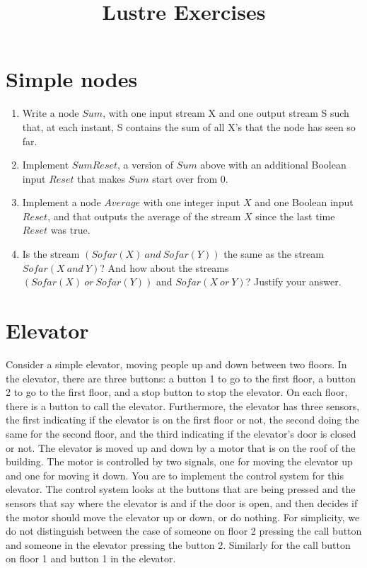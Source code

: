 \documentclass[11pt]{article}
\title{Lustre Exercises}
\begin{document}
\maketitle
\section{Simple nodes}

\begin{enumerate}
\item Write a node $Sum$, with one input stream X and one output stream
  S such that, at each instant, S contains the sum of all X's that the
  node has seen so far.

\item Implement $SumReset$, a version of $Sum$ above with an
  additional Boolean input $Reset$ that makes $Sum$ start over from 0.

\item Implement a node $Average$ with one integer input $X$ and one
  Boolean input $Reset$, and that outputs the average of the stream
  $X$ since the last time $Reset$ was true.

\item Is the stream $(Sofar(X)\ and\ Sofar(Y))$ the same as the stream
  $Sofar(X\ and\ Y)$? And how about the streams $(Sofar(X)\ or\ Sofar(Y))$ and
  $Sofar(X\ or\ Y)$? Justify your answer.
\end{enumerate}


\section{Elevator}

Consider a simple elevator, moving people up and down between two
floors. In the elevator, there are three buttons: a button 1 to go to
the first floor, a button 2 to go to the first floor, and a stop
button to stop the elevator. On each floor, there is a button to call
the elevator. Furthermore, the elevator has three sensors, the first
indicating if the elevator is on the first floor or not, the second
doing the same for the second floor, and the third indicating if the
elevator's door is closed or not.  The elevator is moved up and down
by a motor that is on the roof of the building. The motor is
controlled by two signals, one for moving the elevator up and one for
moving it down.  You are to implement the control system for this
elevator. The control system looks at the buttons that are being
pressed and the sensors that say where the elevator is and if the door
is open, and then decides if the motor should move the elevator up or
down, or do nothing.  For simplicity, we do not distinguish between
the case of someone on floor 2 pressing the call button and someone in
the elevator pressing the button 2. Similarly for the call button on
floor 1 and button 1 in the elevator.
\end{document}
